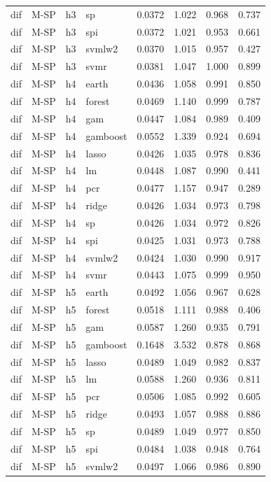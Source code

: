 \begin{ThreePartTable}
\begin{longtable}[t]{llclcccc}
dif & M-SP & h3 & sp & 0.0372 & 1.022 & 0.968 & 0.737\\
dif & M-SP & h3 & spi & 0.0372 & 1.021 & 0.953 & 0.661\\
dif & M-SP & h3 & svmlw2 & 0.0370 & 1.015 & 0.957 & 0.427\\
dif & M-SP & h3 & svmr & 0.0381 & 1.047 & 1.000 & 0.899\\
\addlinespace
dif & M-SP & h4 & earth & 0.0436 & 1.058 & 0.991 & 0.850\\
dif & M-SP & h4 & forest & 0.0469 & 1.140 & 0.999 & 0.787\\
dif & M-SP & h4 & gam & 0.0447 & 1.084 & 0.989 & 0.409\\
dif & M-SP & h4 & gamboost & 0.0552 & 1.339 & 0.924 & 0.694\\
dif & M-SP & h4 & lasso & 0.0426 & 1.035 & 0.978 & 0.836\\
dif & M-SP & h4 & lm & 0.0448 & 1.087 & 0.990 & 0.441\\
dif & M-SP & h4 & pcr & 0.0477 & 1.157 & 0.947 & 0.289\\
dif & M-SP & h4 & ridge & 0.0426 & 1.034 & 0.973 & 0.798\\
dif & M-SP & h4 & sp & 0.0426 & 1.034 & 0.972 & 0.826\\
dif & M-SP & h4 & spi & 0.0425 & 1.031 & 0.973 & 0.788\\
dif & M-SP & h4 & svmlw2 & 0.0424 & 1.030 & 0.990 & 0.917\\
dif & M-SP & h4 & svmr & 0.0443 & 1.075 & 0.999 & 0.950\\
\addlinespace
dif & M-SP & h5 & earth & 0.0492 & 1.056 & 0.967 & 0.628\\
dif & M-SP & h5 & forest & 0.0518 & 1.111 & 0.988 & 0.406\\
dif & M-SP & h5 & gam & 0.0587 & 1.260 & 0.935 & 0.791\\
dif & M-SP & h5 & gamboost & 0.1648 & 3.532 & 0.878 & 0.868\\
dif & M-SP & h5 & lasso & 0.0489 & 1.049 & 0.982 & 0.837\\
dif & M-SP & h5 & lm & 0.0588 & 1.260 & 0.936 & 0.811\\
dif & M-SP & h5 & pcr & 0.0506 & 1.085 & 0.992 & 0.605\\
dif & M-SP & h5 & ridge & 0.0493 & 1.057 & 0.988 & 0.886\\
dif & M-SP & h5 & sp & 0.0489 & 1.049 & 0.977 & 0.850\\
dif & M-SP & h5 & spi & 0.0484 & 1.038 & 0.948 & 0.764\\
dif & M-SP & h5 & svmlw2 & 0.0497 & 1.066 & 0.986 & 0.890\\

\end{longtable}
\end{ThreePartTable}
